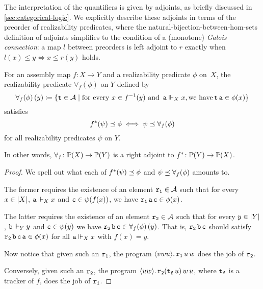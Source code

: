 The interpretation of the quantifiers is given by adjoints, as briefly discussed
in \cref{sec:categorical-logic}. We explicitly describe these adjoints in terms
of the preorder of realizability predicates, where the
natural-bijection-between-hom-sets definition of adjoints simplifies to the
condition of a (monotone) \emph{Galois connection}: a map \(l\) between preorders is
left adjoint to \(r\) exactly when \(l(x) \leq y \iff x \leq r(y)\) holds.

\begin{proposition}
  For an assembly map \(f \colon X \to Y\) and a realizability predicate
  \(\phi\) on~\(X\), the realizability predicate \(\forall_f(\phi)\) on \(Y\)
  defined by
  \[
    {\forall_f(\phi)}\,(y) \coloneqq
    \{\operatorname{\mathtt{t}} \in \mathcal A \mid
      \text{for every } x \in f^{-1}(y) \text{ and } \operatorname{\mathtt{a}} \Vdash_X x, \text{we have}
      \operatorname{\mathtt{t}}\operatorname{\mathtt{a}} \in \phi(x)\}
  \]
  satisfies
  \[
    f^\ast(\psi) \preceq \phi \iff \psi \preceq \forall_f(\phi)
  \]
  for all realizability predicates \(\psi\) on \(Y\).

  In other words, \(\forall_f \colon \mathbb P(X) \to \mathbb P(Y)\) is a right
  adjoint to \(f^\ast \colon \mathbb P(Y) \to \mathbb P(X)\).
\end{proposition}
\begin{proof}
  We spell out what each of \(f^\ast(\psi) \preceq \phi\) and
  \(\psi \preceq \forall_f(\phi)\) amounts to.

  The former requires the existence of an element \(\operatorname{\mathtt{r_1}} \in \mathcal A\) such that
  for every \(x \in \lvert X\rvert\), \(\operatorname{\mathtt{a}} \Vdash_X x\) and
  \(\operatorname{\mathtt{c}} \in \psi(f(x))\), we have \(\operatorname{\mathtt{r_1}}\operatorname{\mathtt{a}}\operatorname{\mathtt{c}} \in \phi(x)\).

  The latter requires the existence of an element \(\operatorname{\mathtt{r_2}} \in \mathcal A\) such
  that for every \(y \in \lvert Y\rvert\), \(\operatorname{\mathtt{b}} \Vdash_Y y\) and
  \(\operatorname{\mathtt{c}} \in \psi(y)\) we have
  \(\operatorname{\mathtt{r_2}}\operatorname{\mathtt{b}}\operatorname{\mathtt{c}} \in \forall_f(\phi)\,(y)\).
  That is, \(\operatorname{\mathtt{r_2}}\operatorname{\mathtt{b}}\operatorname{\mathtt{c}}\) should satisfy
  \(\operatorname{\mathtt{r_2}}\operatorname{\mathtt{b}}\operatorname{\mathtt{c}}\operatorname{\mathtt{a}} \in \phi(x)\) for all
  \(\operatorname{\mathtt{a}} \Vdash_X x\) with \(f(x) = y\).

  Now notice that given such an \(\operatorname{\mathtt{r_1}}\), the program
  \(\langle{{vwu}}\rangle.\,{\operatorname{\mathtt{r_1}}u\,w}\) does the job of \(\operatorname{\mathtt{r_2}}\).

  Conversely, given such an \(\operatorname{\mathtt{r_2}}\), the program
  \(\langle{{uw}}\rangle.\,{\operatorname{\mathtt{r_2}}(\operatorname{\mathtt{t_f}}u)\,w\,u}\), where \(\operatorname{\mathtt{t_f}}\) is a
  tracker of \(f\), does the job of \(\operatorname{\mathtt{r_1}}\).
\end{proof}

